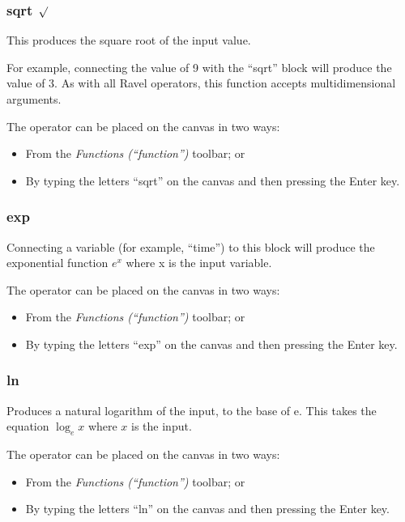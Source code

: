 \subsubsection{sqrt $\protect\surd$}

    
\label{Operation:sqrt} This produces the square root of the input
value.

For example, connecting the value of 9 with the ``sqrt'' block will
produce the value of 3. As with all Ravel operators, this function
accepts multidimensional arguments.

The operator can be placed on the canvas in two ways:
\begin{itemize}
\item From the \emph{Functions (``function'')} toolbar; or 
\item By typing the letters ``sqrt'' on the canvas and then pressing the
Enter key. 
\end{itemize}

\subsubsection{exp}


\label{Operation:exp} Connecting a variable (for example, ``time'')
to this block will produce the exponential function $e^{x}$ where
x is the input variable.

The operator can be placed on the canvas in two ways:
\begin{itemize}
\item From the \emph{Functions (``function'')} toolbar; or 
\item By typing the letters ``exp'' on the canvas and then pressing the
Enter key. 
\end{itemize}

\subsubsection{ln}


\label{Operation:ln} Produces a natural logarithm of the input, to
the base of e. This takes the equation $\log_{e}x$ where $x$ is
the input.

The operator can be placed on the canvas in two ways:
\begin{itemize}
\item From the \emph{Functions (``function'')} toolbar; or 
\item By typing the letters ``ln'' on the canvas and then pressing the Enter
key. 
\end{itemize}

